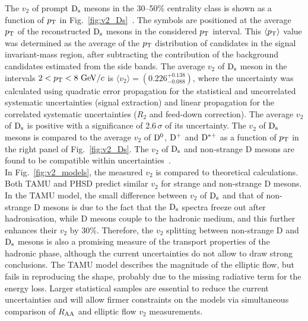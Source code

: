 The $v_2$ of prompt ${\rm D_s}$ mesons in
the 30--50\% centrality class is shown as a function of $p_{\rm T}$ in Fig.~\ref{fig:v2_Ds}~\cite{Acharya:2017qps}.
The symbols are positioned at the average $p_{\rm T}$ of the 
reconstructed ${\rm D_s}$ mesons in the considered $p_{\rm T}$ interval. This $\langle p_{\rm T} \rangle$ value was determined as the 
average of the $p_{\rm T}$ distribution of candidates in the signal invariant-mass region, 
after subtracting the contribution of the background 
candidates estimated from the side bands.
The average $v_2$ of ${\rm D_s}$ meson in
 the intervals $2<p_{\rm T}<8~\mathrm{GeV}/c$ is $\langle v_2 \rangle = (0.226 ^{+0.138}_{-0.088})$,
where the uncertainty was calculated using quadratic error propagation for the
 statistical and uncorrelated systematic uncertainties 
(signal extraction) and linear propagation for the correlated 
systematic uncertainties ($R_2$ and feed-down correction). The average $v_2$ of ${\rm D_s}$ is positive 
with a significance of 2.6\,$\sigma$ of its uncertainty.
The $v_2$ of ${\rm D_s}$ mesons is compared to the average $v_2$ of
${\rm D^0}$, ${\rm D^+}$ and ${\rm D^{*+}}$ as a function of $p_{\rm T}$ in the right
panel of Fig.~\ref{fig:v2_Ds}. The $v_2$ of ${\rm D_s}$ and non-strange D mesons are found
to be compatible within uncertainties~\cite{Acharya:2017qps}.\\


In Fig.~\ref{fig:v2_models}, the measured $v_2$  is compared to theoretical calculations.
Both TAMU and PHSD predict similar $v_2$ for strange and non-strange
D mesons. In the TAMU model, the small difference between $v_2$ of ${\rm D_s}$ and that of
non-strange D mesons is due to the fact that the ${\rm D_s}$ spectra freeze out after
hadronisation, while D mesons couple to the hadronic medium,
and this further enhances their $v_2$ by 30\%. Therefore,
the $v_2$ splitting between non-strange D and ${\rm D_s}$ mesons is also a promising measure of the transport
properties of the hadronic phase, although the current uncertainties do not allow to draw strong conclusions.
The TAMU model describes the magnitude of the elliptic flow, 
but fails in reproducing the shape, probably due to the missing radiative term for the energy loss. 
Larger statistical samples are essential to reduce the current
uncertainties and will allow firmer constraints on the models
via simultaneous comparison of $R_{\rm AA}$ and elliptic flow $v_2$
measurements.

